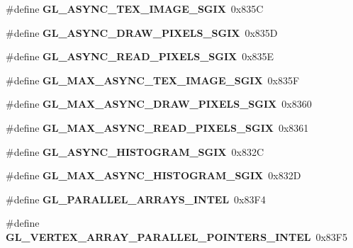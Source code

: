\begin{DoxyCompactItemize}
\item 
\#define {\bfseries G\+L\+\_\+\+A\+S\+Y\+N\+C\+\_\+\+T\+E\+X\+\_\+\+I\+M\+A\+G\+E\+\_\+\+S\+G\+I\+X}~0x835\+C\label{_s_d_l__opengl_8h_a500654aec03cc7a86e290fea2e6a38d0}

\item 
\#define {\bfseries G\+L\+\_\+\+A\+S\+Y\+N\+C\+\_\+\+D\+R\+A\+W\+\_\+\+P\+I\+X\+E\+L\+S\+\_\+\+S\+G\+I\+X}~0x835\+D\label{_s_d_l__opengl_8h_a5ae8694d73094a10f093103018fb5477}

\item 
\#define {\bfseries G\+L\+\_\+\+A\+S\+Y\+N\+C\+\_\+\+R\+E\+A\+D\+\_\+\+P\+I\+X\+E\+L\+S\+\_\+\+S\+G\+I\+X}~0x835\+E\label{_s_d_l__opengl_8h_a5767d42da276fa09870f913ec29b78db}

\item 
\#define {\bfseries G\+L\+\_\+\+M\+A\+X\+\_\+\+A\+S\+Y\+N\+C\+\_\+\+T\+E\+X\+\_\+\+I\+M\+A\+G\+E\+\_\+\+S\+G\+I\+X}~0x835\+F\label{_s_d_l__opengl_8h_a54644a094e18a9b31ebe801fb249df57}

\item 
\#define {\bfseries G\+L\+\_\+\+M\+A\+X\+\_\+\+A\+S\+Y\+N\+C\+\_\+\+D\+R\+A\+W\+\_\+\+P\+I\+X\+E\+L\+S\+\_\+\+S\+G\+I\+X}~0x8360\label{_s_d_l__opengl_8h_a2f654a610cef0663b32cd558ab578c80}

\item 
\#define {\bfseries G\+L\+\_\+\+M\+A\+X\+\_\+\+A\+S\+Y\+N\+C\+\_\+\+R\+E\+A\+D\+\_\+\+P\+I\+X\+E\+L\+S\+\_\+\+S\+G\+I\+X}~0x8361\label{_s_d_l__opengl_8h_abe7bfeea62e567d3b26b4a41f5c089ea}

\item 
\#define {\bfseries G\+L\+\_\+\+A\+S\+Y\+N\+C\+\_\+\+H\+I\+S\+T\+O\+G\+R\+A\+M\+\_\+\+S\+G\+I\+X}~0x832\+C\label{_s_d_l__opengl_8h_a4c83d738a0808bde491e764d04390a37}

\item 
\#define {\bfseries G\+L\+\_\+\+M\+A\+X\+\_\+\+A\+S\+Y\+N\+C\+\_\+\+H\+I\+S\+T\+O\+G\+R\+A\+M\+\_\+\+S\+G\+I\+X}~0x832\+D\label{_s_d_l__opengl_8h_a27b544ff6f42fdc0e38da69560879758}

\item 
\#define {\bfseries G\+L\+\_\+\+P\+A\+R\+A\+L\+L\+E\+L\+\_\+\+A\+R\+R\+A\+Y\+S\+\_\+\+I\+N\+T\+E\+L}~0x83\+F4\label{_s_d_l__opengl_8h_aa677658e85f86b0804ccf291c9b1cee1}

\item 
\#define {\bfseries G\+L\+\_\+\+V\+E\+R\+T\+E\+X\+\_\+\+A\+R\+R\+A\+Y\+\_\+\+P\+A\+R\+A\+L\+L\+E\+L\+\_\+\+P\+O\+I\+N\+T\+E\+R\+S\+\_\+\+I\+N\+T\+E\+L}~0x83\+F5\label{_s_d_l__opengl_8h_ac10e7911b67cb7919439291095f8a623}


\end{DoxyCompactItemize}

